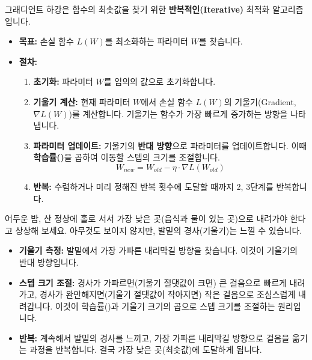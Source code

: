 \documentclass[11pt,a4paper]{article}
\theoremstyle{definition}
\begin{document}
\begin{tcolorbox}[summary, title={그래디언트 하강(Gradient Descent)의 핵심}] %
그래디언트 하강은 함수의 최솟값을 찾기 위한 \textbf{반복적인(Iterative)} 최적화 알고리즘입니다.
\begin{itemize}
    \item \textbf{목표:} 손실 함수 $L(W)$를 최소화하는 파라미터 $W$를 찾습니다.
    \item \textbf{절차:}
    \begin{enumerate}
        \item \textbf{초기화:} 파라미터 $W$를 임의의 값으로 초기화합니다.
        \item \textbf{기울기 계산:} 현재 파라미터 $W$에서 손실 함수 $L(W)$의 기울기(Gradient, $\nabla L(W)$)를 계산합니다. 기울기는 함수가 가장 빠르게 증가하는 방향을 나타냅니다.
        \item \textbf{파라미터 업데이트:} 기울기의 \textbf{반대 방향}으로 파라미터를 업데이트합니다. 이때 \textbf{학습률(\texttt{\eta})}을 곱하여 이동할 스텝의 크기를 조절합니다.
        \[ W_{new} = W_{old} - \eta \cdot \nabla L(W_{old}) \]
        \item \textbf{반복:} 수렴하거나 미리 정해진 반복 횟수에 도달할 때까지 2, 3단계를 반복합니다.
    \end{enumerate}
\end{itemize}
\end{tcolorbox}

\begin{tcolorbox}[example, title={그래디언트 하강 비유: 어두운 산에서 하산하기}] %
어두운 밤, 산 정상에 홀로 서서 가장 낮은 곳(음식과 물이 있는 곳)으로 내려가야 한다고 상상해 보세요. 아무것도 보이지 않지만, 발밑의 경사(기울기)는 느낄 수 있습니다.
\begin{itemize}
    \item \textbf{기울기 측정:} 발밑에서 가장 가파른 내리막길 방향을 찾습니다. 이것이 기울기의 반대 방향입니다.
    \item \textbf{스텝 크기 조절:} 경사가 가파르면(기울기 절댓값이 크면) 큰 걸음으로 빠르게 내려가고, 경사가 완만해지면(기울기 절댓값이 작아지면) 작은 걸음으로 조심스럽게 내려갑니다. 이것이 학습률(\texttt{\eta})과 기울기 크기의 곱으로 스텝 크기를 조절하는 원리입니다.
    \item \textbf{반복:} 계속해서 발밑의 경사를 느끼고, 가장 가파른 내리막길 방향으로 걸음을 옮기는 과정을 반복합니다. 결국 가장 낮은 곳(최솟값)에 도달하게 됩니다.
\end{itemize}
\end{tcolorbox}
\end{document}
